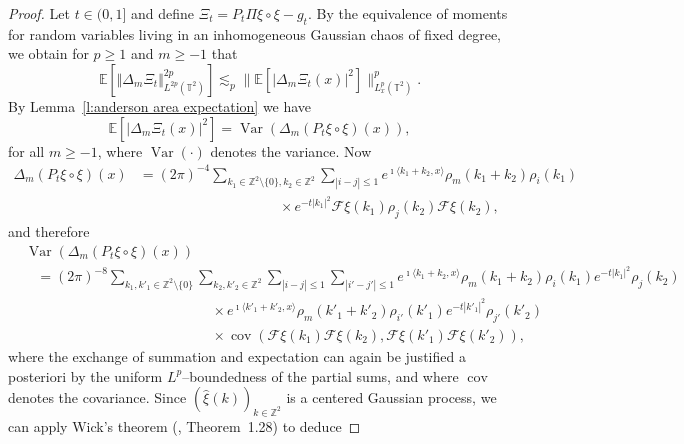 \documentclass[a4paper,11pt]{article}
\newcommand{\tmop}[1]{\ensuremath{\operatorname{#1}}}
\theoremstyle{remark}
\newcommand{\Z}{\mathbb{Z}}
\newcommand{\E}{\mathbb{E}}
\newcommand{\CF}{\ensuremath{\mathscr{F}}}
\newcommand{\reso}{\,\mathord{\circ}\,}
\begin{document}
\begin{proof}
   Let $t \in (0,1]$ and define $\Xi_t = P_t \Pi \xi \reso \xi - g_t$. By the equivalence of moments for random variables living in an inhomogeneous Gaussian chaos of fixed degree, we obtain for $p\geqslant 1$ and $m \geqslant - 1$ that
   \begin{equation}\label{e:anderson area hyper}
      \E [\Vert  \Delta_m \Xi_t \Vert_{L^{2 p} ( \mathbb{T}^2 )}^{2 p}] \lesssim_p \lVert \E[|\Delta_m \Xi_t ( x ) |^2] \rVert ^p_{L^p_x(\mathbb{T}^2)}.
   \end{equation}
   By Lemma~\ref{l:anderson area expectation} we have
   \begin{equation}\label{e:anderson area m-block}
      \E[| \Delta_m \Xi_t(x)|^2] = \tmop{Var} ( \Delta_m ( P_t \xi\reso \xi ) ( x ) ),
   \end{equation}
   for all $m \ge -1$, where $\tmop{Var}(\cdot)$ denotes the variance.
   Now
   \begin{align*}
      \Delta_m ( P_t \xi\reso \xi ) (x) & = ( 2 \pi )^{- 4} \sum_{k_1\in \mathbb{Z}^2 \setminus \{0\}, k_2 \in \Z^2}\sum_{| i - j | \leqslant 1} e^{\imath \langle k_1 + k_2, x \rangle} \rho_m ( k_1 + k_2 ) \rho_i ( k_1 )  \\
      &\hspace{120pt} \times e^{- t | k_1 |^2} \CF{\xi} ( k_1 ) \rho_j (k_2) \CF{\xi} ( k_2 ),
   \end{align*}
   and therefore
   \begin{align*}
      &\tmop{Var} ( \Delta_m ( P_t \xi\reso \xi ) ( x ) )\\
      &\hspace{10pt} = ( 2 \pi )^{- 8} \sum_{k_1, k'_1 \in \mathbb{Z}^2 \setminus \{0\}} \sum_{k_2, k'_2 \in \mathbb{Z}^2} \sum_{| i - j | \leqslant 1} \sum_{| i' - j' | \leqslant 1} e^{\imath \langle k_1 + k_2, x \rangle} \rho_m ( k_1 + k_2 ) \rho_i ( k_1) e^{- t | k_1 |^2} \rho_j ( k_2 )\\
      &\hspace{160pt} \times e^{\imath \langle k'_1 + k'_2, x \rangle} \rho_m (k'_1 + k'_2 ) \rho_{i'} ( k'_1 ) e^{- t | k'_1 |^2}\rho_{j'} ( k'_2 ) \\
      &\hspace{160pt} \times \tmop{cov}(\CF{\xi} ( k_1 )\CF{\xi} ( k_2 ), \CF{\xi} ( k'_1 ) \CF{\xi}( k'_2 ) ),
   \end{align*}
   where the exchange of summation and expectation can again be justified a posteriori by the uniform $L^p$--boundedness of the partial sums, and where $\tmop{cov}$ denotes the covariance. Since $( \widehat{\xi} (k) )_{k \in \mathbb{Z}^2}$ is a centered Gaussian process, we can apply Wick's theorem (\cite{Janson1997}, Theorem~1.28) to deduce

\end{proof}
\end{document}
